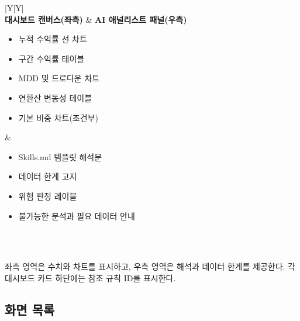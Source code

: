 \documentclass[10pt,a4paper]{article}
\begin{document}
\begin{table}[htbp]
\centering
\small
\begin{tabularx}{\textwidth}{|Y|Y|}
\hline
{} \\
\hline
\textbf{대시보드 캔버스(좌측)} & \textbf{AI 애널리스트 패널(우측)} \\
\hline
\begin{itemize}[leftmargin=*, itemsep=1pt]
\item 누적 수익률 선 차트
\item 구간 수익률 테이블
\item MDD 및 드로다운 차트
\item 연환산 변동성 테이블
\item 기본 비중 차트(조건부)
\end{itemize}
&
\begin{itemize}[leftmargin=*, itemsep=1pt]
\item Skills.md 템플릿 해석문
\item 데이터 한계 고지
\item 위험 판정 레이블
\item 불가능한 분석과 필요 데이터 안내
\end{itemize}
\\
\hline
{} \\
\hline
\end{tabularx}
\caption{LENS 메인 화면 구조}
\end{table}

좌측 영역은 수치와 차트를 표시하고, 우측 영역은 해석과 데이터 한계를 제공한다. 각 대시보드 카드 하단에는 참조 규칙 ID를 표시한다.

\subsection{화면 목록}\label{uxd654uxba74-uxbaa9uxb85d}
\end{document}
